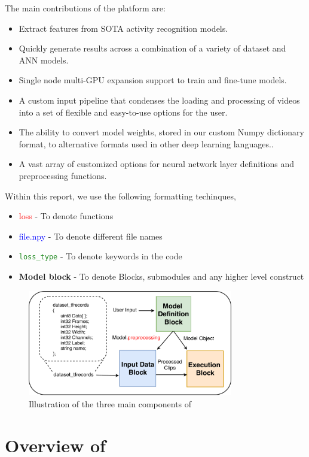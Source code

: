 \documentclass{llncs}
\begin{document}
The main contributions of the platform are:
\begin{itemize}
\item Extract features from SOTA activity recognition models.
\item Quickly generate results across a combination of a variety of dataset and ANN models.
\item Single node multi-GPU expansion support to train and fine-tune models.
\item A custom input pipeline that condenses the loading and processing of videos into a set of flexible and easy-to-use options for the user.
\item The ability to convert model weights, stored in our custom Numpy dictionary format, to alternative formats used in other deep learning languages..
\item A vast array of customized options for neural network layer definitions and preprocessing functions.
\end{itemize}

Within this report, we use the following formatting techinques,
\begin{itemize}
\item \textcolor{red}{loss} - To denote functions
\item \textcolor{blue}{file.npy} - To denote different file names
\item \texttt{\textcolor{ForestGreen}{loss\_type}} - To denote keywords in the code
\item \textbf{Model block} - To denote Blocks, submodules and any higher level construct
\end{itemize}

\begin{figure}[b!]
\centering
\includegraphics[width=0.8\textwidth]{images/overview.pdf}
\caption{Illustration of the three main components of \acro}
\label{fig:overview}
\end{figure}


\section{Overview of \acro}
\label{sec:overview}
\end{document}
